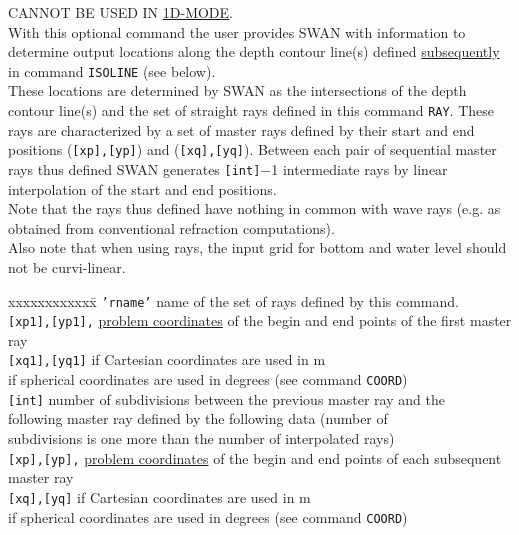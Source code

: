 \documentclass[12pt]{book}
\begin{document}
\noindent
CANNOT BE USED IN \underline{1D-MODE}.
\\[2ex]
With this optional command the user provides SWAN with information to determine output locations along
the depth contour line(s) defined \underline{subsequently} in command {\tt ISOLINE} (see below).
\\[2ex]
These locations are determined by SWAN as the intersections of the depth contour line(s) and the set of
straight rays defined in this command {\tt RAY}. These rays are characterized by a set of master rays defined
by their start and end positions ({\tt [xp],[yp]}) and ({\tt [xq],[yq]}). Between each pair of sequential master rays thus
defined SWAN generates {\tt [int]}$-$1 intermediate rays by linear interpolation of the start and end positions.
\\[2ex]
Note that the rays thus defined have nothing in common with wave rays (e.g. as obtained from conventional refraction computations).
\\[2ex]
Also note that when using rays, the input grid for bottom and water level should not be curvi-linear.

\begin{tabbing}
 xxxxxxxxxxxx\= \kill
{\tt 'rname'}      \> name of the set of rays defined by this command.\\
{\tt [xp1],[yp1],} \> \underline{problem coordinates} of the begin and end points of the first master ray\\
{\tt [xq1],[yq1]}  \> if Cartesian coordinates are used in m\+\\
                      if spherical coordinates are used in degrees (see command {\tt COORD})\-\\
{\tt [int]}        \> number of subdivisions between the previous master ray and the\+\\
                      following master ray defined by the following data (number of\\
                      subdivisions is one more than the number of interpolated rays)\-\\
{\tt [xp],[yp],}   \> \underline{problem coordinates} of the begin and end points of each subsequent master ray\\
{\tt [xq],[yq]}    \> if Cartesian coordinates are used in m\+\\
                      if spherical coordinates are used in degrees (see command {\tt COORD})\-\\
\end{tabbing}
\end{document}
